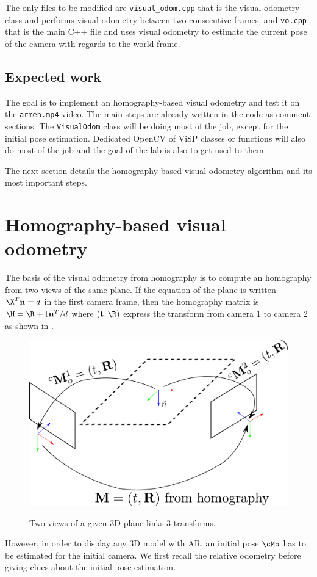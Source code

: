 \documentclass{ecnreport}
\begin{document}
The only files to be modified are \texttt{visual\_odom.cpp} that is the visual odometry class and performs visual odometry between two consecutive frames, and \texttt{vo.cpp} that is the main 
C++ file and uses visual odometry to estimate the current pose of the camera with regards to the world frame.


\subsection{Expected work}

The goal is to implement an homography-based visual odometry and test it on the \texttt{armen.mp4} video.
The main steps are already written in the code as comment sections. The \texttt{VisualOdom} class will be doing most of the job, except for the initial pose estimation. 
Dedicated OpenCV of ViSP classes or functions will also do most of the job and the goal of the lab is also to get used to them.

The next section details the homography-based visual odometry algorithm and its most important steps.

\def\n{\mathbf{n}}
\def\t{\mathbf{t}}
\section{Homography-based visual odometry}

The basis of the visual odometry from homography is to compute an homography from two views of the same plane. 
If the equation of the plane is written $\X^T\n = d$ in the first camera frame, then the homography matrix is $\H = \R + \t\n^T/d$
where $(\t, \R)$ express the transform from camera 1 to camera 2 as shown in .


\begin{figure}[h!]
\centering\label{fig:homog}
 \includegraphics[width=.5\linewidth]{homog}
 \caption{Two views of a given 3D plane links 3 transforms.}
\end{figure}
However, in order to display any 3D model with AR, an initial pose $\cMo$ has to be estimated for the initial camera. We first recall the relative
odometry before giving clues about the initial pose estimation.
\end{document}
